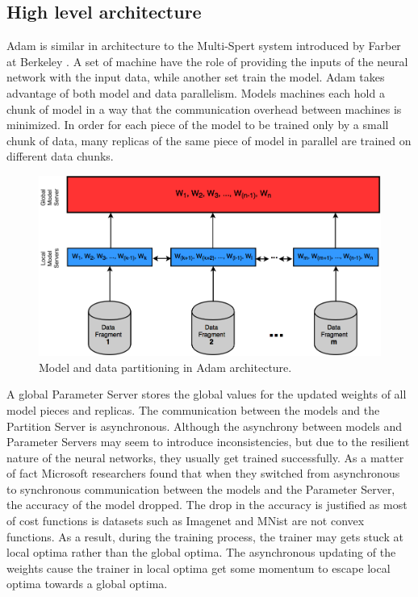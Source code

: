 \documentclass[runningheads,a4paper]{llncs}
\begin{document}
{\subsection*{High level architecture}
Adam is similar in architecture to the Multi-Spert system introduced by Farber at Berkeley \cite{farber1997parallel}. A set of machine have the role of providing the inputs of the neural network with the input data, while another set train the model. Adam takes advantage of both model and data parallelism. Models machines each hold a chunk of model in a way that the communication overhead between machines is minimized. In order for each piece of the model to be trained only by a small chunk of data, many replicas of the same piece of model in parallel are trained on different data chunks.\\
\begin{figure}[h]
	\includegraphics[scale=0.33]{./images/adam_architecture.png}
	\centering
	\caption{Model and data partitioning in Adam architecture\cite{chilimbi2014project}.}
	\label{fig:adam_parallelism}
\end{figure}

A global Parameter Server stores the global values for the updated weights of all model pieces and replicas. The communication between the models and the Partition Server is asynchronous. Although the asynchrony between models and Parameter Servers may seem to introduce inconsistencies, but due to the resilient nature of the neural networks, they usually get trained successfully. As a matter of fact Microsoft researchers found that when they switched from asynchronous to synchronous communication between the models and the Parameter Server, the accuracy of the model dropped. The drop in the accuracy is justified as most of cost functions is datasets such as Imagenet and MNist are not convex functions. As a result, during the training process, the trainer may gets stuck at local optima rather than the global optima. The asynchronous updating of the weights cause the trainer in local optima get some momentum to escape local optima towards a global optima.\\

}
\end{document}
